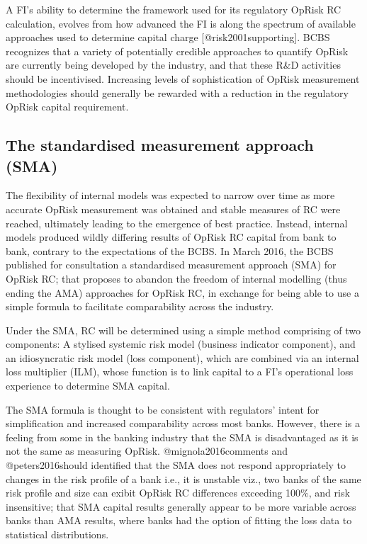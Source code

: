 \documentclass[]{article}
\begin{document}
A FI's ability to determine the framework used for its regulatory OpRisk
RC calculation, evolves from how advanced the FI is along the spectrum
of available approaches used to determine capital charge
{[}@risk2001supporting{]}. BCBS recognizes that a variety of potentially
credible approaches to quantify OpRisk are currently being developed by
the industry, and that these R\&D activities should be incentivised.
Increasing levels of sophistication of OpRisk measurement methodologies
should generally be rewarded with a reduction in the regulatory OpRisk
capital requirement.

\subsection{The standardised measurement approach (SMA)}

The flexibility of internal models was expected to narrow over time as
more accurate OpRisk measurement was obtained and stable measures of RC
were reached, ultimately leading to the emergence of best practice.
Instead, internal models produced wildly differing results of OpRisk RC
capital from bank to bank, contrary to the expectations of the BCBS. In
March 2016, the BCBS published for consultation a standardised
measurement approach (SMA) for OpRisk RC; that proposes to abandon the
freedom of internal modelling (thus ending the AMA) approaches for
OpRisk RC, in exchange for being able to use a simple formula to
facilitate comparability across the industry.\medskip

Under the SMA, RC will be determined using a simple method comprising of
two components: A stylised systemic risk model (business indicator
component), and an idiosyncratic risk model (loss component), which are
combined via an internal loss multiplier (ILM), whose function is to
link capital to a FI's operational loss experience to determine SMA
capital.\medskip

The SMA formula is thought to be consistent with regulators' intent for
simplification and increased comparability across most banks. However,
there is a feeling from some in the banking industry that the SMA is
disadvantaged as it is not the same as measuring OpRisk.
@mignola2016comments and @peters2016should identified that the SMA does
not respond appropriately to changes in the risk profile of a bank i.e.,
it is unstable viz., two banks of the same risk profile and size can
exibit OpRisk RC differences exceeding 100\%, and risk insensitive; that
SMA capital results generally appear to be more variable across banks
than AMA results, where banks had the option of fitting the loss data to
statistical distributions.
\end{document}
